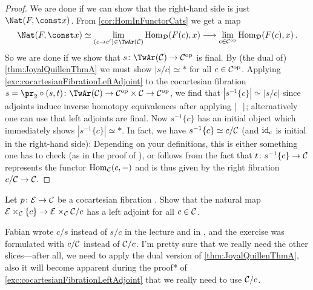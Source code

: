 \begin{proof}
	We are done if we can show that the right-hand side is just $\Nat(F,\const x)$. From \cref{cor:HomInFunctorCats} we get a map
	\begin{equation*}
		\Nat(F,\const x)\simeq \limit_{(c\rightarrow c')\in\TwAr(\Cc)}\Hom_\Dd(F(c),x)\morphism\limit_{c\in\Cc^\op}\Hom_\Dd(F(c),x)\,.
	\end{equation*}
	So we are done if we show that $s\colon\TwAr(\Cc)\morphism\Cc^\op$ is final. By (the dual of) \cref{thm:JoyalQuillenThmA} we must show $|s/c|\simeq *$ for all $c\in \mathcal{C}^{\mathrm{op}}$. Applying \cref{exc:cocartesianFibrationLeftAdjoint} to the cocartesian fibration $s={\pr_2}\circ(s,t)\colon\TwAr(\Cc)\morphism\Cc^\op\times\Cc\morphism\Cc^\op$, we find that $|s^{-1}\{c\}|\simeq|s/c|$ since adjoints induce inverse homotopy equivalences after applying $|\blank|$; alternatively one can use that left adjoints are final. Now $s^{-1}\{c\}$ has an initial object which immediately shows $|s^{-1}\{c\}|\simeq *$. In fact, we have $s^{-1}\{c\}\simeq c/\mathcal{C}$ (and $\operatorname{id}_c$ is initial in the right-hand side): Depending on your definitions, this is either something one has to check (as in the proof of \cite[Proposition~]{HA}), or follows from the fact that $t\colon s^{-1}\{c\}\morphism \Cc$ represents the functor $\operatorname{Hom}_{\mathcal{C}}(c,-)$ and is thus given by the right fibration $c/\Cc\morphism \Cc$.
\end{proof}
\begin{exc}\label{exc:cocartesianFibrationLeftAdjoint}
	Let $p\colon \Ee\morphism\Cc$ be a cocartesian fibration . Show that the natural map $\Ee\times_\Cc\{c\}\morphism \Ee\times_\Cc \Cc/c$ has a left adjoint for all $c\in \mathcal{C}$.
\end{exc}
Fabian wrote $c/s$ instead of $s/c$ in the lecture and in \cite[Corollar~I.50]{KTheory}, and the exercise was formulated with $c/\mathcal{C}$ instead of $\mathcal{C}/c$. I'm pretty sure that we really need the other slices---after all, we need to apply the dual version of \cref{thm:JoyalQuillenThmA}, also it will become apparent during the proof* of \cref{exc:cocartesianFibrationLeftAdjoint} that we really need to use $\mathcal{C}/c$.

